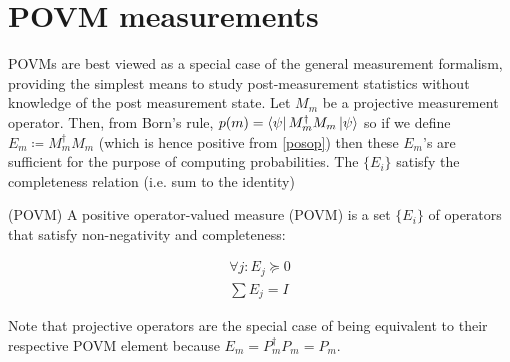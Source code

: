 \documentclass[main.tex]{subfiles}
\begin{document}



\section{POVM measurements}\label{povm}

POVMs are best viewed as a special case of the general measurement formalism, providing the simplest means to study post-measurement statistics without knowledge of the post measurement state. Let $M_m$ be a projective measurement operator. Then, from Born's rule, $p(m) = \bra{\psi} M_m^\dagger M_m \ket{\psi}$ so if we define $E_m \coloneqq M_m^\dagger M_m$ (which is hence positive from \ref{posop}) then these $E_m$'s are sufficient for the purpose of computing probabilities. The $\{ E_i \}$ satisfy the completeness relation (i.e. sum to the identity)

\begin{definition}
(POVM) A positive operator-valued measure (POVM) is a set $\{E_i\}$ of operators that satisfy non-negativity and completeness:

\begin{align*}
\forall	j: E_j \succcurlyeq 0 \\
\sum E_j = I
\end{align*}
\end{definition}

Note that projective operators are the special case of being equivalent to their respective POVM element because $E_m = P_m^\dag P_m = P_m$.
\end{document}

